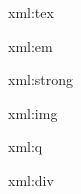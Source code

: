 \startxmlsetups xml:tex
\stopxmlsetups

\startxmlsetups xml:em
\stopxmlsetups

\startxmlsetups xml:strong
\stopxmlsetups

\startxmlsetups xml:img
  \starttexcode
  \stoptexcode
\stopxmlsetups

\startxmlsetups xml:q
\stopxmlsetups

\startxmlsetups xml:div
  \stop
\stopxmlsetups


